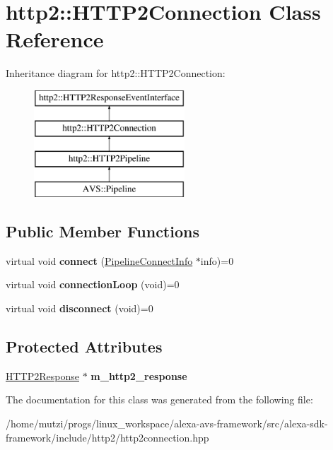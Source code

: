 \hypertarget{classhttp2_1_1HTTP2Connection}{}\section{http2\+:\+:H\+T\+T\+P2\+Connection Class Reference}
\label{classhttp2_1_1HTTP2Connection}
Inheritance diagram for http2\+:\+:H\+T\+T\+P2\+Connection\+:\begin{figure}[H]
\begin{center}
\leavevmode
\includegraphics[height=4.000000cm]{d3/d9f/classhttp2_1_1HTTP2Connection}
\end{center}
\end{figure}
\subsection*{Public Member Functions}
\begin{DoxyCompactItemize}
\item 
\mbox{\label{classhttp2_1_1HTTP2Connection_a6b4182ab24b1c2f4c5dfbb92a46b44a1}} 
virtual void {\bfseries connect} (\hyperlink{classhttp2_1_1PipelineConnectInfo}{Pipeline\+Connect\+Info} $\ast$info)=0
\item 
\mbox{\label{classhttp2_1_1HTTP2Connection_a15a370eba8b30bb62cfeb06088201e11}} 
virtual void {\bfseries connection\+Loop} (void)=0
\item 
\mbox{\label{classhttp2_1_1HTTP2Connection_ab0733078b017d56c4633696dcce69eb9}} 
virtual void {\bfseries disconnect} (void)=0
\end{DoxyCompactItemize}
\subsection*{Protected Attributes}
\begin{DoxyCompactItemize}
\item 
\mbox{\label{classhttp2_1_1HTTP2Connection_afb27e0858d0c827096903fcb9f908422}} 
\hyperlink{classhttp2_1_1HTTP2Response}{H\+T\+T\+P2\+Response} $\ast$ {\bfseries m\+\_\+http2\+\_\+response}
\end{DoxyCompactItemize}


The documentation for this class was generated from the following file\+:\begin{DoxyCompactItemize}
\item 
/home/mutzi/progs/linux\+\_\+workspace/alexa-\/avs-\/framework/src/alexa-\/sdk-\/framework/include/http2/http2connection.\+hpp\end{DoxyCompactItemize}
